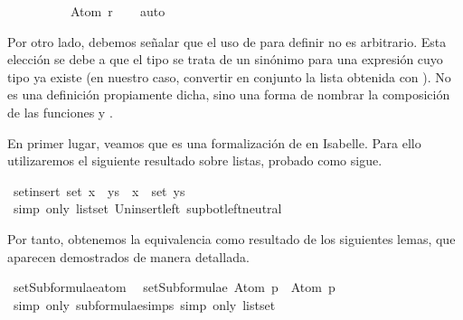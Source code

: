 \begin{isabellebody}
\ \ \ \ \ \ \ \ \ \ Atom\ r{\isacharbraceright}{\isachardoublequoteclose}\isanewline
\ \ \isamarkupfalse%
\ auto%
\endisatagproof
{\isafoldproof}%
%
\isadelimproof
\ \ \ \isanewline
%
\endisadelimproof
{}\isamarkupfalse%
%
\begin{isamarkuptext}%
Por otro lado, debemos señalar que el uso de 
   para definir  no es 
  arbitrario. Esta elección se debe a que el tipo  
  se trata de un sinónimo para una expresión cuyo tipo ya existe (en 
  nuestro caso, convertir en conjunto la lista obtenida con 
  ). No es una definición propiamente dicha, sino 
  una forma de nombrar la composición de las funciones  y 
  .

  En primer lugar, veamos que  es una
  formalización de  en Isabelle. Para ello 
  utilizaremos el siguiente resultado sobre listas, probado como sigue.%
\end{isamarkuptext}\isamarkuptrue%
\isamarkupfalse%
\ set{\isacharunderscore}insert{\isacharcolon}\ {\isachardoublequoteopen}set\ {\isacharparenleft}x\ {\isacharhash}\ ys{\isacharparenright}\ {\isacharequal}\ {\isacharbraceleft}x{\isacharbraceright}\ {\isasymunion}\ set\ ys{\isachardoublequoteclose}\isanewline
%
\isadelimproof
\ \ %
\endisadelimproof
%
\isatagproof
{}\isamarkupfalse%
\ {\isacharparenleft}simp\ only{\isacharcolon}\ list{\isachardot}set{\isacharparenleft}{}{\isacharparenright}\ Un{\isacharunderscore}insert{\isacharunderscore}left\ sup{\isacharunderscore}bot{\isachardot}left{\isacharunderscore}neutral{\isacharparenright}%
\endisatagproof
{\isafoldproof}%
%
\isadelimproof
%
\endisadelimproof
%
\begin{isamarkuptext}%
Por tanto, obtenemos la equivalencia como resultado de los 
  siguientes lemas, que aparecen demostrados de manera detallada.%
\end{isamarkuptext}\isamarkuptrue%
\isamarkupfalse%
\ setSubformulae{\isacharunderscore}atom{\isacharcolon}\isanewline
\ \ {\isachardoublequoteopen}setSubformulae\ {\isacharparenleft}Atom\ p{\isacharparenright}\ {\isacharequal}\ {\isacharbraceleft}Atom\ p{\isacharbraceright}{\isachardoublequoteclose}\isanewline
%
\isadelimproof
\ \ \ \ %
\endisadelimproof
%
\isatagproof
{}\isamarkupfalse%
\ {\isacharparenleft}simp\ only{\isacharcolon}\ subformulae{\isachardot}simps{\isacharparenleft}{}{\isacharparenright}{\isacharcomma}\ simp\ only{\isacharcolon}\ list{\isachardot}set{\isacharparenright}%

\end{isabellebody}
